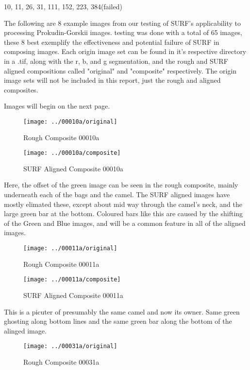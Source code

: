 \documentclass[10pt]{IEEEtran}
\begin{document}
10, 11, 26, 31, 111, 152, 223, 384(failed)

The following are 8 example images from our testing of SURF's applicability to processing Prokudin-Gorskii images. testing was done with a total of 65 images, these 8 best exemplify the effectiveness and potential failure of SURF in composing images. Each origin image set can be found in it's respective directory in a .tif, along with the r, b, and g segmentation, and the rough and SURF aligned compositions called "original" and "composite" respectively. The origin image sets will not be included in this report, just the rough and aligned composites. 

Images will begin on the next page.
\newpage

\begin{figure}[!htb]
\caption{Rough Composite 00010a}
\texttt{[image: ../00010a/original]}
\end{figure}

\begin{figure}[!htb]
\caption{SURF Aligned Composite 00010a}
\texttt{[image: ../00010a/composite]}
\end{figure}

Here, the offset of the green image can be seen in the rough composite, mainly underneath each of the bags and the camel. The SURF aligned images have mostly elimated these, except about mid way through the camel's neck, and the large green bar at the bottom. Coloured bars like this are caused by the shifting of the Green and Blue images, and will be a common feature in all of the aligned images.

\FloatBarrier

\begin{figure}[!htb]
\caption{Rough Composite 00011a}
\texttt{[image: ../00011a/original]}
\end{figure}

\begin{figure}[!htb]
\caption{SURF Aligned Composite 00011a}
\texttt{[image: ../00011a/composite]}
\end{figure}

\FloatBarrier

This is a picuter of presumably the same camel and now its owner. Same green ghosting along bottom lines and the same green bar along the bottom of the alinged image. 


\begin{figure}[!htb]
\caption{Rough Composite 00031a}
\texttt{[image: ../00031a/original]}
\end{figure}
\end{document}
